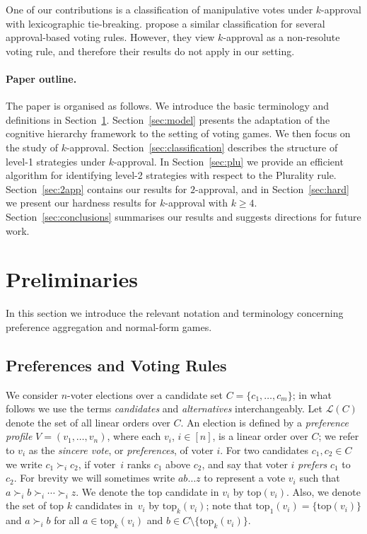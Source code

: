 \documentclass[11pt]{article}
\newcommand{\calL}{\mathcal{L}}
\newcommand{\tp}{\mathrm{top}}
\begin{document}
One of our contributions is a classification of manipulative votes under $k$-approval with 
lexicographic tie-breaking. \citet{peters2012manipulability} propose a similar classification for several 
approval-based voting rules. However, they view $k$-approval as a non-resolute voting rule, and therefore 
their results do not apply in our setting.

\paragraph{Paper outline.} The paper is organised as follows.
We introduce the basic terminology and definitions in Section~\ref{sec:prelim}.
Section~\ref{sec:model} presents the adaptation of the cognitive hierarchy framework to the setting of voting games.
We then focus on the study of $k$-approval. Section~\ref{sec:classification} 
describes the structure of level-1 strategies under $k$-approval.
In Section~\ref{sec:plu} we provide an efficient algorithm for identifying level-2
strategies with respect to the Plurality rule. Section~\ref{sec:2app}
contains our results for $2$-approval, and in Section~\ref{sec:hard} we present
our hardness results for $k$-approval with $k\ge 4$.  
Section~\ref{sec:conclusions} summarises our results and suggests directions for future work.


\section{Preliminaries}\label{sec:prelim}
In this section we introduce the relevant notation and terminology 
concerning preference aggregation and normal-form games.
\subsection{Preferences and Voting Rules}
We consider $n$-voter elections over a candidate set $C=\{c_1, \dots, c_m\}$; in what follows we use
the terms {\em candidates} and {\em alternatives} interchangeably. Let $\calL(C)$ denote the set
of all linear orders over $C$.
An election is defined by a {\em preference profile} $V=(v_1, \dots, v_n)$, where each $v_i$,
$i\in [n]$, is a linear order over $C$; we refer to $v_i$ as the {\em sincere vote}, or {\em preferences}, of voter $i$.
For two candidates $c_1, c_2\in C$ we write $c_1\succ_i c_2$, if voter~$i$ ranks $c_1$ above $c_2$, and say that voter $i$ {\em prefers} $c_1$ to $c_2$.
For brevity we will sometimes write $ab\dots z$ to represent a vote $v_i$ such that $a\succ_i b\succ_i\cdots\succ_i z$.
We denote the top candidate in $v_i$ by $\tp(v_i)$.  Also, we denote the set of top $k$ candidates in~$v_i$
by $\tp_k(v_i)$; note that $\tp_1(v_i)=\{\tp(v_i)\}$ and
$a\succ_i b$ for all $a\in\tp_k(v_i)$ and $b\in C\setminus\{\tp_k(v_i)\}$.
\end{document}
